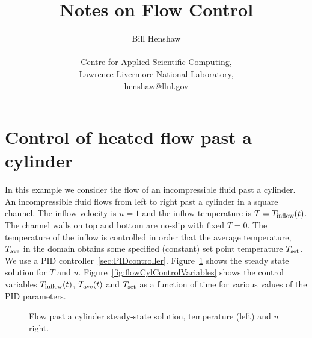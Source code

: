 \documentclass[11pt]{article}
\begin{document}
 
\title{Notes on Flow Control}

\author{
Bill Henshaw \\
\  \\
Centre for Applied Scientific Computing, \\
Lawrence Livermore National Laboratory, \\
henshaw@llnl.gov }
 
\maketitle

\tableofcontents


\clearpage 
\newcommand{\Tinflow}{T_{\rm inflow}}
\newcommand{\Tset}{T_{\rm set}}
\newcommand{\Tave}{T_{\rm ave}}
\section{Control of heated flow past a cylinder}

In this example we consider the flow of an incompressible fluid past a cylinder. 
An incompressible fluid flows from left to right past a cylinder in a square channel. The inflow velocity is $u=1$ and the
inflow temperature is $T=\Tinflow(t)$. The channel walls on top and bottom are no-slip with fixed $T=0$. 
The temperature
of the inflow is controlled in order that the average temperature, $\Tave$ in the domain 
obtains
some specified (constant) set point temperature $\Tset$. 
We use a PID controller~\ref{sec:PIDcontroller}. 
% 
Figure~\ref{fig:flowCyl} shows the steady state solution for $T$ and $u$.
Figure~\ref{fig:flowCylControlVariables} shows the control variables $\Tinflow(t)$, $\Tave(t)$ and $\Tset$ as a function
of time for various values of the PID parameters.


\begin{figure}[hbt]
\newcommand{\figWidth}{7.25cm}
\newcommand{\trimfig}[2]{\trimFig{#1}{#2}{0.0}{0.0}{.2}{.0}}
\begin{center}
\end{center}
  \caption{Flow past a cylinder steady-state solution, temperature (left) and $u$ right. }
  \label{fig:flowCyl}
\end{figure}
\end{document}
